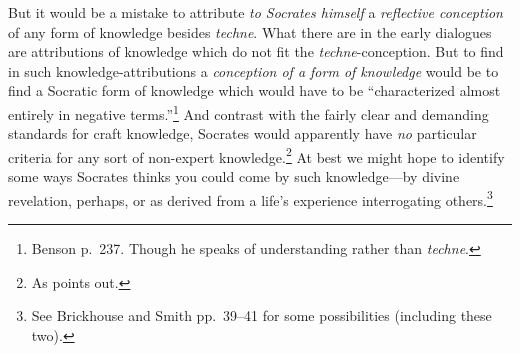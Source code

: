 ﻿\documentclass[11pt]{amsart}
\begin{document}








But it would be a mistake to attribute \emph{to Socrates himself} a \emph{reflective conception} of any form of knowledge besides \emph{techne}. What there are in the early dialogues are attributions of knowledge which do not fit the \emph{techne}-conception. But to find in such knowledge-attributions a \emph{conception of a form of knowledge} would be to find a Socratic form of knowledge which would have to be ``characterized almost entirely in negative terms.''\footnote{Benson p.~237. Though he speaks of understanding rather than \emph{techne}.} And contrast with the fairly clear and demanding standards for craft knowledge, Socrates would apparently have \emph{no} particular criteria for any sort of non-expert knowledge.\footnote{As \citet[77]{woodruff1990pse} points out.} At best we might hope to identify some ways Socrates thinks you could come by such knowledge---by divine revelation, perhaps, or as derived from a life's experience interrogating others.\footnote{See Brickhouse and Smith pp.~39--41 for some possibilities (including these two).}
\end{document}
